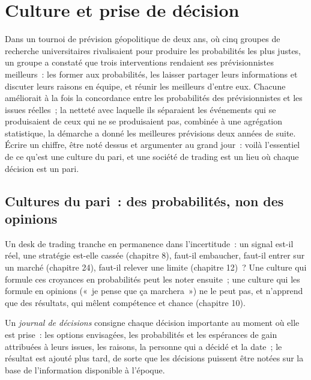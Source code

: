 \chapter{Culture et prise de décision}\label{ch:fm:culture-and-decision-making}

Dans un tournoi de prévision géopolitique de deux ans, où cinq groupes de recherche universitaires rivalisaient pour produire les probabilités les plus justes, un groupe a constaté que trois interventions rendaient ses prévisionnistes meilleurs~:
les former aux probabilités, les laisser partager leurs informations et discuter leurs raisons en équipe, et réunir les meilleurs d'entre eux. Chacune améliorait à la fois la concordance entre les probabilités des prévisionnistes et les issues réelles~;
la netteté avec laquelle ils séparaient les événements qui se produisaient de ceux qui ne se produisaient pas, combinée à une agrégation statistique, la démarche a donné les meilleures prévisions deux années de suite.
Écrire un chiffre, être noté dessus et argumenter au grand jour~:
voilà l'essentiel de ce qu'est une culture du pari,
et une société de trading est un lieu où chaque décision est un pari.

\section{Cultures du pari~: des probabilités, non des opinions}

Un desk de trading tranche en permanence dans l'incertitude~: un signal est-il réel, une stratégie est-elle cassée (chapitre 8), faut-il embaucher, faut-il entrer sur un
marché (chapitre 24), faut-il relever une limite (chapitre 12)~? Une culture qui formule ces croyances en probabilités peut les noter ensuite~; une culture qui les formule en opinions («~je pense que ça marchera~») ne le peut pas,
et n'apprend que des résultats, qui mêlent compétence et chance (chapitre 10).

\begin{definition}\label{def:fm:culture-and-decision-making:journal}
Un \emph{journal de décisions} consigne chaque décision importante au moment où elle est prise~: les options envisagées, les probabilités
et les espérances de gain attribuées à leurs issues, les raisons, la personne qui a décidé et la date~; le résultat est ajouté plus tard, de sorte que les décisions puissent être
notées sur la base de l'information disponible à l'époque.
\end{definition}

